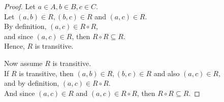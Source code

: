 \documentclass[titlepage, letterpaper, fleqn]{article}
\newcommand{\spacepls}{\vspace{5mm}}
\begin{document}
\begin{proof}
Let \(a \in A, b \in B, c \in C\).\\
Let \((a,b) \in R, (b,c) \in R\) and \((a,c) \in R\).\\
By definition, \((a,c) \in R \circ R\),\\
and since \((a,c) \in R\), then \(R \circ R \subseteq R\).\\
Hence, \(R\) is transitive.

\spacepls

Now assume \(R\) is transitive.\\
If \(R\) is transitive, then \((a,b) \in R, (b,c) \in R\) and also \((a,c) \in R\),\\
and by definition, \((a,c) \in R \circ R\).\\
And since \((a,c) \in R\) and \((a,c) \in R \circ R\), then \(R \circ R \subseteq R\).
\end{proof}
\end{document}
